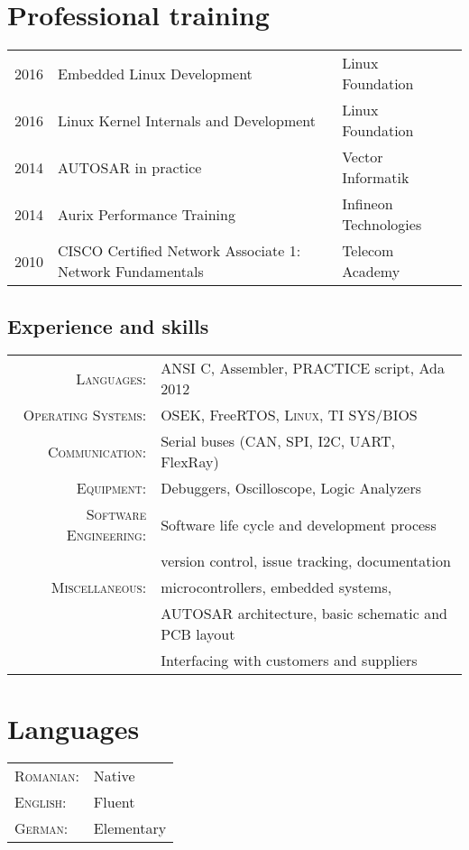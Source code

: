 \documentclass[a4paper,10pt]{article}
\begin{document}
\section{Professional training}
\begin{tabular}{lll}
 \textsc{2016} & Embedded Linux Development & \footnotesize Linux Foundation\normalsize\\
 \textsc{2016} & Linux Kernel Internals and Development & \footnotesize Linux Foundation \normalsize  \\
 \textsc{2014} & AUTOSAR in practice & \footnotesize Vector Informatik \normalsize  \\
 \textsc{2014} & Aurix Performance Training & \footnotesize Infineon Technologies \normalsize\\
 \textsc{2010} & CISCO Certified Network Associate 1: Network Fundamentals & \footnotesize Telecom Academy \normalsize
\end{tabular}


\begin{spacing}{1.2}
\section{Experience and skills}
\begin{tabular}{rl}
\textsc{Languages:} & ANSI C, Assembler, PRACTICE script, Ada 2012 \\
\textsc{Operating Systems:} & OSEK, FreeRTOS, \textsc{Linux}, TI SYS/BIOS \\
\textsc{Communication:} & Serial buses (CAN, SPI, I2C, UART, FlexRay) \\
\textsc{Equipment:} & Debuggers, Oscilloscope, Logic Analyzers \\
\textsc{Software Engineering:} & Software life cycle and development process\\
& version control, issue tracking, documentation\\
\textsc{Miscellaneous:} & microcontrollers, embedded systems, \\
& AUTOSAR architecture, basic schematic and PCB layout \\
& Interfacing with customers and suppliers\\
\end{tabular}
\end{spacing}

\section{Languages}
\begin{tabular}{ll}
 \textsc{Romanian:}& Native\\
\textsc{English:}& Fluent\\
\textsc{German:}& Elementary\\
\end{tabular}
\end{document}
